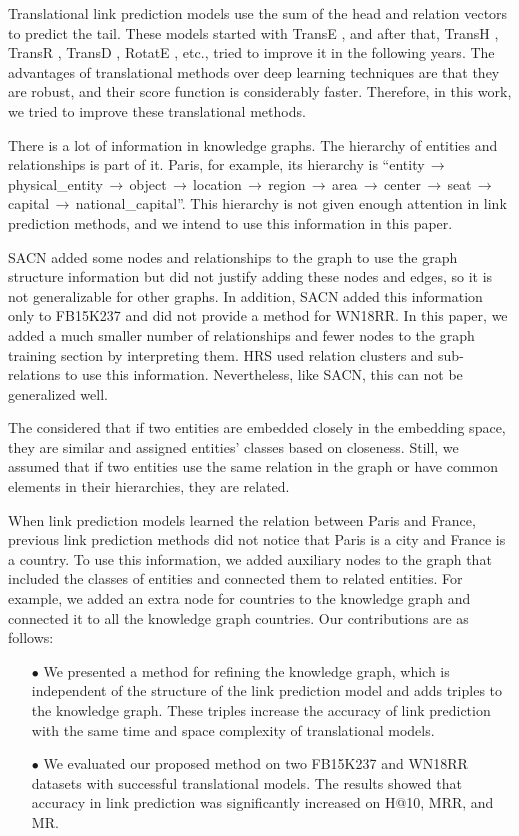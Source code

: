 \documentclass{article} \usepackage{iclr2022_conference,times}
\begin{document}
Translational link prediction models use the sum of the head and relation vectors to predict the tail. These models started with TransE \citep{bordes2013translating}, and after that, TransH \citep{transh}, TransR \citep{lin2015learning}, TransD \citep{ji2015knowledge}, RotatE \citep{rotate}, etc., tried to improve it in the following years. The advantages of translational methods over deep learning techniques are that they are robust, and their score function is considerably faster. Therefore, in this work, we tried to improve these translational methods.

\indent There is a lot of information in knowledge graphs. The hierarchy of entities and relationships is part of it. Paris, for example, its hierarchy is ``entity$\,\to\,$physical\_entity$\,\to\,$object$\,\to\,$location$\,\to\,$region$\,\to\,$area$\,\to\,$center$\,\to\,$seat$\,\to\,$capital$\,\to\,$national\_capital''. This hierarchy is not given enough attention in link prediction methods, and we intend to use this information in this paper.

\indent SACN \citep{sacn_paper} added some nodes and relationships to the graph to use the graph structure information but did not justify adding these nodes and edges, so it is not generalizable for other graphs. In addition, SACN added this information only to FB15K237 and did not provide a method for WN18RR. In this paper, we added a much smaller number of relationships and fewer nodes to the graph training section by interpreting them. HRS \citep{zhang2018knowledge} used relation clusters and sub-relations to use this information. Nevertheless, like SACN, this can not be generalized well.

The \citep{moon2017learning} considered that if two entities are embedded closely in the embedding space, they are similar and assigned entities' classes based on closeness. Still, we assumed that if two entities use the same relation in the graph or have common elements in their hierarchies, they are related. 

When link prediction models learned the relation between Paris and France, previous link prediction methods did not notice that Paris is a city and France is a country. To use this information, we added auxiliary nodes to the graph that included the classes of entities and connected them to related entities. For example, we added an extra node for countries to the knowledge graph and connected it to all the knowledge graph countries. Our contributions are as follows:
\begin{enumerate}
	\item[$\bullet$]  We presented a method for refining the knowledge graph, which is independent of the structure of the link prediction model and adds triples to the knowledge graph. These triples increase the accuracy of link prediction with the same time and space complexity of translational models.
	\item[$\bullet$]  We evaluated our proposed method on two FB15K237 and WN18RR datasets with successful translational models. The results showed that accuracy in link prediction was significantly increased on H@10, MRR, and MR.
  \end{enumerate}
\end{document}
